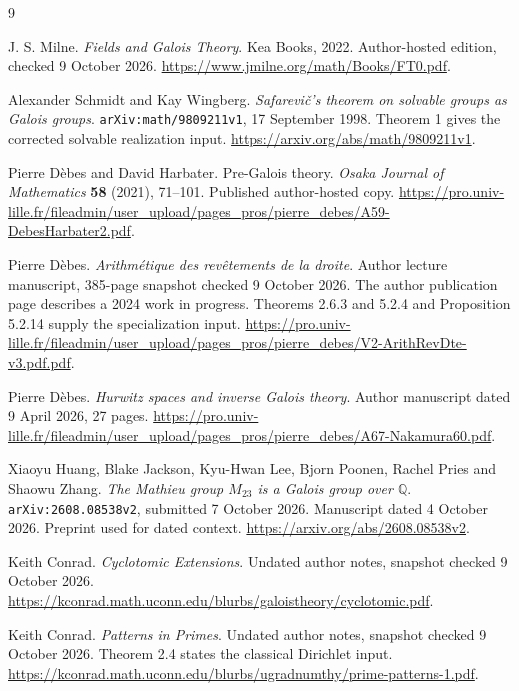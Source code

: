 \renewcommand{\bibname}{Primary sources}
\begin{thebibliography}{9}

J. S. Milne.
\emph{Fields and Galois Theory}.
Kea Books, 2022.
Author-hosted edition, checked 9 October 2026.
\url{https://www.jmilne.org/math/Books/FT0.pdf}.

Alexander Schmidt and Kay Wingberg.
\emph{Safarevi\v{c}'s theorem on solvable groups as Galois groups}.
\texttt{arXiv:math/9809211v1}, 17 September 1998.
Theorem 1 gives the corrected solvable realization input.
\url{https://arxiv.org/abs/math/9809211v1}.

Pierre D\`ebes and David Harbater.
Pre-Galois theory.
\emph{Osaka Journal of Mathematics} \textbf{58} (2021), 71--101.
Published author-hosted copy.
\url{https://pro.univ-lille.fr/fileadmin/user_upload/pages_pros/pierre_debes/A59-DebesHarbater2.pdf}.

Pierre D\`ebes.
\emph{Arithm\'etique des rev\^etements de la droite}.
Author lecture manuscript, 385-page snapshot checked 9 October 2026.
The author publication page describes a 2024 work in progress.
Theorems 2.6.3 and 5.2.4 and Proposition 5.2.14 supply the specialization input.
\url{https://pro.univ-lille.fr/fileadmin/user_upload/pages_pros/pierre_debes/V2-ArithRevDte-v3.pdf.pdf}.

Pierre D\`ebes.
\emph{Hurwitz spaces and inverse Galois theory}.
Author manuscript dated 9 April 2026, 27 pages.
\url{https://pro.univ-lille.fr/fileadmin/user_upload/pages_pros/pierre_debes/A67-Nakamura60.pdf}.

Xiaoyu Huang, Blake Jackson, Kyu-Hwan Lee, Bjorn Poonen,
Rachel Pries and Shaowu Zhang.
\emph{The Mathieu group $M_{23}$ is a Galois group over $\mathbb Q$}.
\texttt{arXiv:2608.08538v2}, submitted 7 October 2026.
Manuscript dated 4 October 2026. Preprint used for dated context.
\url{https://arxiv.org/abs/2608.08538v2}.

Keith Conrad.
\emph{Cyclotomic Extensions}.
Undated author notes, snapshot checked 9 October 2026.
\url{https://kconrad.math.uconn.edu/blurbs/galoistheory/cyclotomic.pdf}.

Keith Conrad.
\emph{Patterns in Primes}.
Undated author notes, snapshot checked 9 October 2026.
Theorem 2.4 states the classical Dirichlet input.
\url{https://kconrad.math.uconn.edu/blurbs/ugradnumthy/prime-patterns-1.pdf}.

\end{thebibliography}
